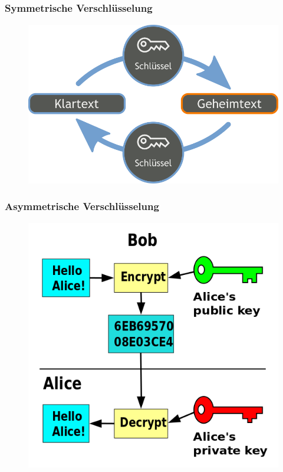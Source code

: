 \documentclass[12pt]{beamer}
\begin{document}
\subsection{}

\begin{frame}
\frametitle{Symmetrische Verschlüsselung}
\begin{figure}
  \includegraphics[height=0.7\textheight]{img/verschl_sym.png}
\end{figure}
\end{frame}

\begin{frame}
\frametitle{Asymmetrische Verschlüsselung}
\begin{figure}
  \includegraphics[height=0.7\textheight]{img/verschl_asym.png}
\end{figure}
\end{frame}
\end{document}
